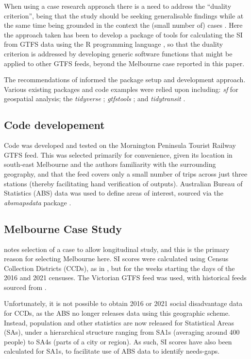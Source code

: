 \documentclass[preprint, 3p,
authoryear]{elsarticle} %
\begin{document}
When using a case research approach there is a need to address the
``duality criterion'', being that the study should be seeking
generalisable findings while at the same time being grounded in the
context the (small number of) cases
\citep{Denscombe2007aa, Ketokivi2014aa}. Here the approach taken has
been to develop a package of tools for calculating the SI from GTFS data
using the R programming language \citep{R-base}, so that the duality
criterion is addressed by developing generic software functions that
might be applied to other GTFS feeds, beyond the Melbourne case reported
in this paper.

The recommendations of \citet{wickham2023r} informed the package setup
and development approach. Various existing packages and code examples
were relied upon including: \emph{sf} \citep{R-sf} for geospatial
analysis; the \emph{tidyverse} \citep{tidyverse2019}; \emph{gtfstools}
\citep{R-gtfstools}; and \emph{tidytransit} \citep{R-tidytransit}.

\subsection{Code developement}\label{code-developement}

Code was developed and tested on the Mornington Peninsula Tourist
Railway GTFS feed. This was selected primarily for convenience, given
its location in south-east Melbourne and the authors familiarity with
the surrounding geography, and that the feed covers only a small number
of trips across just three stations (thereby facilitating hand
verification of outputs). Australian Bureau of Statistics (ABS) data was
used to define areas of interest, sourced via the \emph{absmapsdata}
package \citep{R-absmapsdata}.

\subsection{Melbourne Case Study}\label{melbourne-case-study}

\citet{Yin2009aa} notes selection of a case to allow longitudinal study,
and this is the primary reason for selecting Melbourne here. SI scores
were calculated using Census Collection Districts (CCDs), as in
\citet{currie2010identifying}, but for the weeks starting the days of
the 2016 and 2021 censuses. The Victorian GTFS feed was used, with
historical feeds sourced from \citet{transitfeeds_victoria:2023aa}.

Unfortunately, it is not possible to obtain 2016 or 2021 social
disadvantage data for CCDs, as the ABS no longer releases data using
this geographic scheme. Instead, population and other statistics are now
released for Statistical Areas (SAs), under a hierarchical structure
ranging from SA1s (averaging around 400 people) to SA4s (parts of a city
or region)\citep{ABSmaps}. As such, SI scores have also been calculated
for SA1s, to facilitate use of ABS data to identify needs-gaps.
\end{document}
